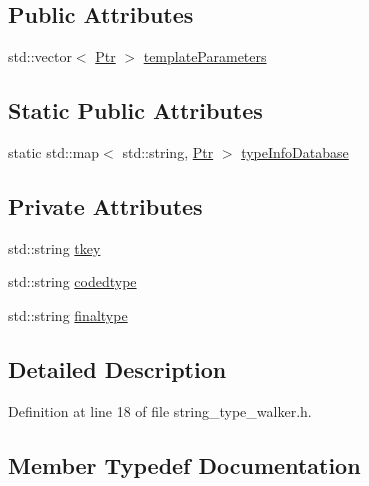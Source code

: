 \subsection*{Public Attributes}
\begin{DoxyCompactItemize}
\item 
std\+::vector$<$ \hyperlink{classsmacc_1_1introspection_1_1TypeInfo_aa6ffd9c39811d59f7c771941b7fad860}{Ptr} $>$ \hyperlink{classsmacc_1_1introspection_1_1TypeInfo_aed5166ab8bcd94489e7bc87deb01de5c}{template\+Parameters}
\end{DoxyCompactItemize}
\subsection*{Static Public Attributes}
\begin{DoxyCompactItemize}
\item 
static std\+::map$<$ std\+::string, \hyperlink{classsmacc_1_1introspection_1_1TypeInfo_aa6ffd9c39811d59f7c771941b7fad860}{Ptr} $>$ \hyperlink{classsmacc_1_1introspection_1_1TypeInfo_ab780c03206b824aaf338135d16b0eff4}{type\+Info\+Database}
\end{DoxyCompactItemize}
\subsection*{Private Attributes}
\begin{DoxyCompactItemize}
\item 
std\+::string \hyperlink{classsmacc_1_1introspection_1_1TypeInfo_a697dd505119258dba1224d10eea5b2bd}{tkey}
\item 
std\+::string \hyperlink{classsmacc_1_1introspection_1_1TypeInfo_a117d2b73994b78a6e4e81cdf7054912c}{codedtype}
\item 
std\+::string \hyperlink{classsmacc_1_1introspection_1_1TypeInfo_aa4010ed427e12db443e08ab16a3de243}{finaltype}
\end{DoxyCompactItemize}


\subsection{Detailed Description}


Definition at line 18 of file string\+\_\+type\+\_\+walker.\+h.



\subsection{Member Typedef Documentation}
\mbox{\label{classsmacc_1_1introspection_1_1TypeInfo_aa6ffd9c39811d59f7c771941b7fad860}} 
